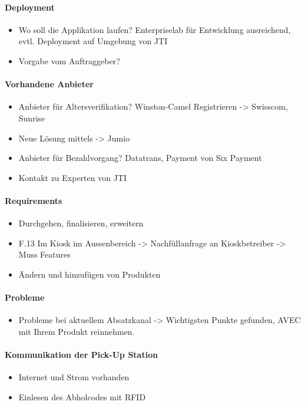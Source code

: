 \paragraph{Deployment}
\begin{itemize}
	\item Wo soll die Applikation laufen? Enterpriselab für Entwicklung ausreichend, \ac{evtl}. Deployment auf Umgebung von JTI
	\item Vorgabe vom Auftraggeber? 
\end{itemize}
\paragraph{Vorhandene Anbieter}
\begin{itemize}
	\item Anbieter für Altersverifikation? Winston-Camel Registrieren -> Swisscom, Sunrise
	\item Neue Lösung mittels -> Jumio
	\item Anbieter für Bezahlvorgang? Datatrans, Payment von Six Payment 
	\item Kontakt zu Experten von JTI
\end{itemize}
\paragraph{Requirements}
\begin{itemize}
	\item Durchgehen, finalisieren, erweitern
	\item F.13 Im Kiosk im Aussenbereich -> Nachfüllanfrage an Kioskbetreiber -> Muss Features
	\item Ändern und hinzufügen von Produkten
\end{itemize}
\paragraph{Probleme}
	\begin{itemize}
	\item Probleme bei aktuellem Absatzkanal -> Wichtigsten Punkte gefunden, AVEC mit Ihrem Produkt reinnehmen. 
	\end{itemize}
\paragraph{Kommunikation der Pick-Up Station}
	\begin{itemize}
	\item Internet und Strom vorhanden
	\item Einlesen des Abholcodes mit RFID
\end{itemize}

